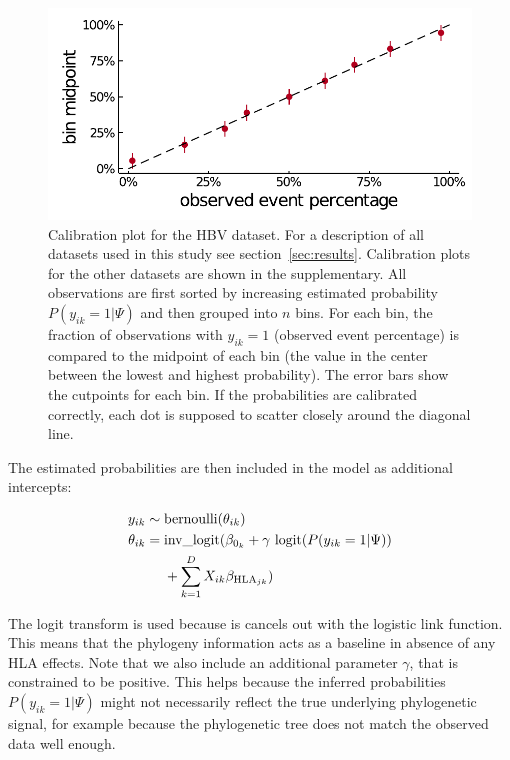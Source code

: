 \documentclass[fleqn,11pt]{SelfArx} %
\begin{document}
\begin{figure}[!ht]
  \includegraphics[width=1\linewidth]{plots/phylogeny_calibration.pdf}
  \caption{Calibration plot for the HBV dataset. For a description of all datasets used in this study see section~\ref{sec:results}. Calibration plots for the other datasets are shown in the supplementary.
  All observations are first sorted by increasing estimated probability \(P(y_{ik}=1|\Psi)\) and then grouped into \(n\) bins.
  For each bin, the fraction of observations with \(y_{ik}=1\) (observed event percentage) is compared to the midpoint of each bin (the value in the center between the lowest and highest probability). The error bars show the cutpoints for each bin. If the probabilities are calibrated correctly, each dot is supposed to scatter closely around the diagonal line.}
  \label{fig:phylogeny-calibration}
\end{figure}

The estimated probabilities are then included in the model as additional intercepts:

\begin{equation}
\begin{aligned}
  y_{ik} & \sim \text{bernoulli}(\theta_{ik}) \\
  \theta_{ik} & = \text{inv\_logit}(\beta_{0_{k}} + \gamma~\text{logit}(P(y_{ik}=1|\Psi)) \\ \hspace{-6cm} &~~~~ + \sum_{k=1}^{D}X_{ik}\beta_{\text{HLA}_{jk}})
\end{aligned}
\end{equation}

The logit transform is used because is cancels out with the logistic link function. This means that the phylogeny information acts as a baseline in absence of any HLA effects. Note that we also include an additional parameter \(\gamma\), that is constrained to be positive. This helps because the inferred probabilities \(P(y_{ik}=1|\Psi)\) might not necessarily reflect the true underlying phylogenetic signal, for example because the phylogenetic tree does not match the observed data well enough.
\end{document}
